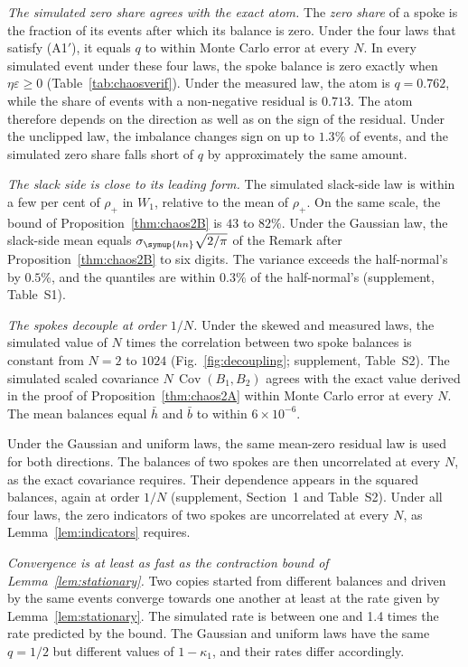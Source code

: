 \documentclass[11pt,a4paper]{article}
\theoremstyle{siphon}
\begin{document}
\emph{The simulated zero share agrees with the exact atom.} The \emph{zero share} of a spoke is the fraction of its events after which its balance is zero. Under the four laws that satisfy (A1$'$), it equals $q$ to within Monte Carlo error at every $N$. In every simulated event under these four laws, the spoke balance is zero exactly when $\eta\varepsilon \geq 0$ (Table~\ref{tab:chaosverif}). Under the measured law, the atom is $q = 0.762$, while the share of events with a non-negative residual is $0.713$. The atom therefore depends on the direction as well as on the sign of the residual. Under the unclipped law, the imbalance changes sign on up to $1.3\%$ of events, and the simulated zero share falls short of $q$ by approximately the same amount.

\emph{The slack side is close to its leading form.} The simulated slack-side law is within a few per cent of $\rho_+$ in $W_1$, relative to the mean of $\rho_+$. On the same scale, the bound of Proposition~\ref{thm:chaos2B} is $43$ to $82\%$. Under the Gaussian law, the slack-side mean equals $\sigma_{\symup{hn}}\sqrt{2/\pi}$ of the Remark after Proposition~\ref{thm:chaos2B} to six digits. The variance exceeds the half-normal's by $0.5\%$, and the quantiles are within $0.3\%$ of the half-normal's (supplement, Table~S1).

\emph{The spokes decouple at order $1/N$.} Under the skewed and measured laws, the simulated value of $N$ times the correlation between two spoke balances is constant from $N = 2$ to $1024$ (Fig.~\ref{fig:decoupling}; supplement, Table~S2). The simulated scaled covariance $N\,\operatorname{Cov}(B_1, B_2)$ agrees with the exact value derived in the proof of Proposition~\ref{thm:chaos2A} within Monte Carlo error at every $N$. The mean balances equal $\bar h$ and $\bar b$ to within $6 \times 10^{-6}$.

Under the Gaussian and uniform laws, the same mean-zero residual law is used for both directions. The balances of two spokes are then uncorrelated at every $N$, as the exact covariance requires. Their dependence appears in the squared balances, again at order $1/N$ (supplement, Section~1 and Table~S2). Under all four laws, the zero indicators of two spokes are uncorrelated at every $N$, as Lemma~\ref{lem:indicators} requires.

\emph{Convergence is at least as fast as the contraction bound of Lemma~\ref{lem:stationary}.} Two copies started from different balances and driven by the same events converge towards one another at least at the rate given by Lemma~\ref{lem:stationary}. The simulated rate is between one and 1.4 times the rate predicted by the bound. The Gaussian and uniform laws have the same $q = 1/2$ but different values of $1 - \kappa_1$, and their rates differ accordingly.
\end{document}
